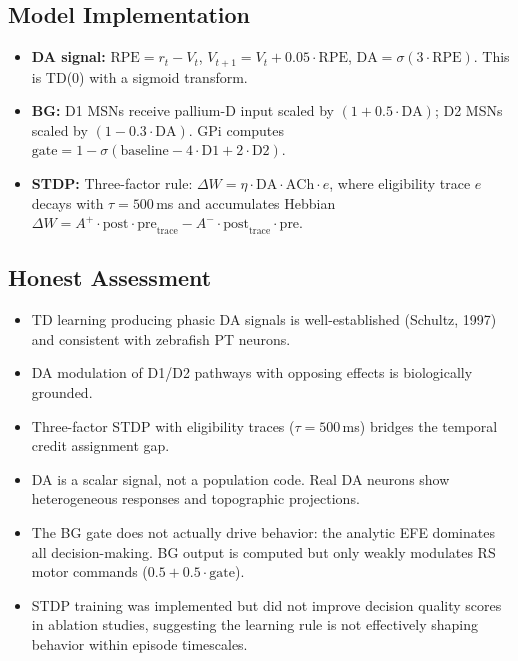 \documentclass[11pt,a4paper]{article}
\begin{document}
\subsection{Model Implementation}

\begin{itemize}[leftmargin=*]
\item \textbf{DA signal:} $\text{RPE} = r_t - V_t$, $V_{t+1} = V_t + 0.05 \cdot \text{RPE}$,
  $\text{DA} = \sigma(3 \cdot \text{RPE})$.  This is TD(0) with a sigmoid transform.
\item \textbf{BG:} D1 MSNs receive pallium-D input scaled by $(1 + 0.5 \cdot \text{DA})$;
  D2 MSNs scaled by $(1 - 0.3 \cdot \text{DA})$.  GPi computes
  $\text{gate} = 1 - \sigma(\text{baseline} - 4 \cdot \text{D1} + 2 \cdot \text{D2})$.
\item \textbf{STDP:} Three-factor rule: $\Delta W = \eta \cdot \text{DA} \cdot \text{ACh} \cdot e$,
  where eligibility trace $e$ decays with $\tau = 500$\,ms and accumulates
  Hebbian $\Delta W = A^+ \cdot \text{post} \cdot \text{pre}_\text{trace} - A^- \cdot \text{post}_\text{trace} \cdot \text{pre}$.
\end{itemize}

\subsection{Honest Assessment}

\begin{itemize}[leftmargin=*]
\item[\textcolor{realistic}{$\checkmark$}] TD learning producing phasic DA signals
  is well-established (Schultz, 1997) and consistent with zebrafish PT neurons.
\item[\textcolor{realistic}{$\checkmark$}] DA modulation of D1/D2 pathways with
  opposing effects is biologically grounded.
\item[\textcolor{realistic}{$\checkmark$}] Three-factor STDP with eligibility traces
  ($\tau=500$\,ms) bridges the temporal credit assignment gap.
\item[\textcolor{missing}{$\times$}] DA is a scalar signal, not a population code.
  Real DA neurons show heterogeneous responses and topographic projections.
\item[\textcolor{missing}{$\times$}] The BG gate does not actually drive behavior:
  the analytic EFE dominates all decision-making.  BG output is computed but
  only weakly modulates RS motor commands ($0.5 + 0.5 \cdot \text{gate}$).
\item[\textcolor{missing}{$\times$}] STDP training was implemented but did not
  improve decision quality scores in ablation studies, suggesting the learning
  rule is not effectively shaping behavior within episode timescales.
\end{itemize}
\end{document}
